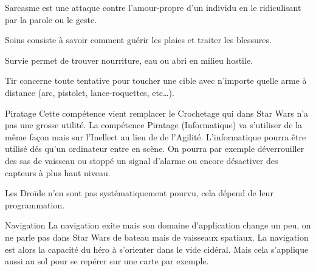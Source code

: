 \begin{description}[align=left]
    \item [Sarcasme (Int)]
        Sarcasme est une attaque contre l’amour-propre d’un individu en le ridiculisant par la parole ou le geste.

    \item [Soins (Int)]
        Soins consiste à savoir comment guérir les plaies et traiter les blessures.

    \item [Survie (Int)]
        Survie permet de trouver nourriture, eau ou abri en milieu hostile.

    \item [Tir (Agi)]
        Tir concerne toute tentative pour toucher une cible avec n’importe quelle arme à distance (arc, pistolet, lance-roquettes, etc\ldots).
\end{description}

\begin{paperbox}{Piratage}
    Cette compétence vient remplacer le Crochetage qui dans Star Wars n'a pas une grosse utilité. La compétence Piratage (Informatique) va s'utiliser de la même façon mais sur l'Inellect au lieu de de l'Agilité. L'informatique pourra être utilisé dés qu'un ordinateur entre en scène. On pourra par exemple déverrouiller des sas de vaisseau ou stoppé un signal d'alarme ou encore désactiver des capteurs à plus haut niveau.

    Les Droïde n'en sont pas systématiquement pourvu, cela dépend de leur programmation.
\end{paperbox}

\begin{paperbox}{Navigation}
    La navigation exite mais son domaine d'application change un peu, on ne parle pas dans Star Wars de bateau mais de vaisseaux spatiaux. La navigation est alors la capacité du héro à s'orienter dans le vide cidéral. Mais cela s'applique aussi au sol pour se repérer sur une carte par exemple.
\end{paperbox}